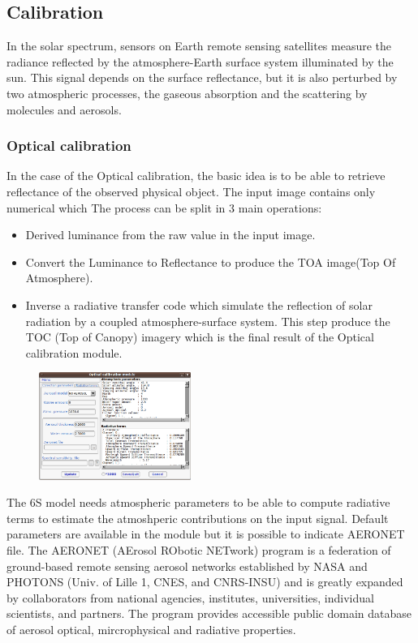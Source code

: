 \subsection{Calibration}
In the solar spectrum, sensors on Earth remote sensing satellites
measure the radiance reflected by the atmosphere-Earth surface system
illuminated by the sun. This signal depends on the surface
reflectance, but it is also perturbed by two atmospheric processes,
the gaseous absorption and the scattering by molecules and aerosols.


\subsubsection{Optical calibration}
In the case of the Optical calibration, the basic idea is to be able
to retrieve reflectance of the observed physical object.  The input
image contains only numerical which The process can be split in 3 main
operations:
\begin{itemize}
\item Derived luminance from the raw value in the input image. 
\item Convert the Luminance to Reflectance to produce the TOA
  image(Top Of Atmosphere).
\item Inverse a radiative transfer code which simulate the reflection
  of solar radiation by a coupled atmosphere-surface system. This step
  produce the TOC (Top of Canopy) imagery which is the final result of
  the Optical calibration module.
\end{itemize}

\begin{figure}
  \center
  \includegraphics[width=0.44\textwidth]{../Art/MonteverdiImages/monteverdi_optical_calibration.png}
  \label{fig:opticalcalibration}
\end{figure}

The 6S model needs atmospheric parameters to be able to compute
radiative terms to estimate the atmoshperic contributions on the input
signal. Default parameters are available in the module but it is
possible to indicate AERONET file. The AERONET (AErosol RObotic
NETwork) program is a federation of ground-based remote sensing
aerosol networks established by NASA and PHOTONS (Univ. of Lille 1,
CNES, and CNRS-INSU) and is greatly expanded by collaborators from
national agencies, institutes, universities, individual scientists,
and partners. The program provides accessible public domain database
of aerosol optical, mircrophysical and radiative properties.

